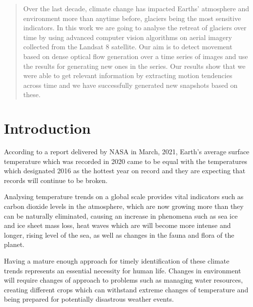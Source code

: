 \documentclass[12pt, a4paper]{report}
\begin{document}
	\begin{abstract} %
		\vspace{1.0cm}
		\vspace{1.0cm}
		\par Over the last decade, climate change has impacted Earths' atmosphere and environment more than anytime before, glaciers being the most sensitive indicators. In this work we are going to analyse the retreat of glaciers over time by using advanced computer vision algorithms on aerial imagery collected from the Landsat 8 satellite. Our aim is to detect movement based on dense optical flow generation over a time series of images and use the results for generating new ones in the series. Our results show that we were able to get relevant information by extracting motion tendencies across time and we have successfully generated new snapshots based on these. 
		
	\end{abstract} %

	\newpage{}

	\tableofcontents{}
	\listoffigures{}
	\listoftables{}
	
	\newpage{}

	\chapter{Introduction}
	
	\par According to a report delivered by NASA in March, 2021, Earth's average surface temperature which was recorded in 2020 came to be equal with the temperatures which designated 2016 as the hottest year on record \cite{NASA2020} and they are expecting that records will continue to be broken.
	
	\par Analysing temperature trends on a global scale provides vital indicators such as carbon dioxide levels in the atmosphere, which are now growing more than they can be naturally eliminated, causing an increase in  phenomena such as sea ice and ice sheet mass loss, heat waves which are will become more intense and longer, rising level of the sea, as well as changes in the fauna and flora of the planet.
	
	\par Having a mature enough approach for timely identification of these climate trends represents an essential necessity for human life. Changes in environment will require changes of approach to problems such as managing water resources, creating different crops which can withstand extreme changes of temperature and being prepared for potentially disastrous weather events.
	
\end{document}
